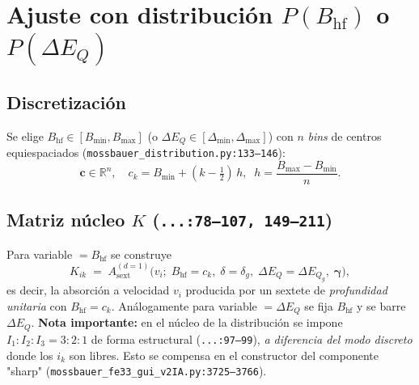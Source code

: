 \documentclass[11pt,a4paper]{article}
\newcommand{\BHF}{B_{\mathrm{hf}}}
\newcommand{\dEQ}{\Delta E_{Q}}
\newcommand{\file}[1]{\textcolor{black!70}{\texttt{\small #1}}}
\begin{document}
\section{Ajuste con distribución $P(\BHF)$ o $P(\dEQ)$}\label{sec:dist}

\subsection{Discretización}
Se elige $\BHF\in[B_{\min},B_{\max}]$ (o $\dEQ\in[\Delta_{\min},\Delta_{\max}]$) con $n$ \emph{bins} de centros equiespaciados (\file{mossbauer\_distribution.py:133--146}):
\begin{equation}
  \bm c \in \mathbb R^{n}, \quad c_k = B_{\min} + (k-\tfrac12)\,h,\;\; h = \frac{B_{\max}-B_{\min}}{n}.
\end{equation}

\subsection{Matriz núcleo $K$ (\file{...:78--107, 149--211})}
Para variable $=\BHF$ se construye
\begin{equation}
  K_{ik} \;=\; A_{\text{sext}}^{(d=1)}\bigl(v_i;\;\BHF=c_k,\;\delta=\delta_g,\;\dEQ=\dEQ_g,\;\bm\gamma\bigr),
  \label{eq:Kdef}
\end{equation}
es decir, la absorción a velocidad $v_i$ producida por un sextete de \emph{profundidad unitaria} con $\BHF=c_k$. Análogamente para variable $=\dEQ$ se fija $\BHF$ y se barre $\dEQ$. \textbf{Nota importante:} en el núcleo de la distribución se impone $I_1{:}I_2{:}I_3 = 3{:}2{:}1$ de forma estructural (\file{...:97--99}), \emph{a diferencia del modo discreto} donde los $i_k$ son libres. Esto se compensa en el constructor del componente "sharp" (\file{mossbauer\_fe33\_gui\_v2IA.py:3725--3766}).
\end{document}
